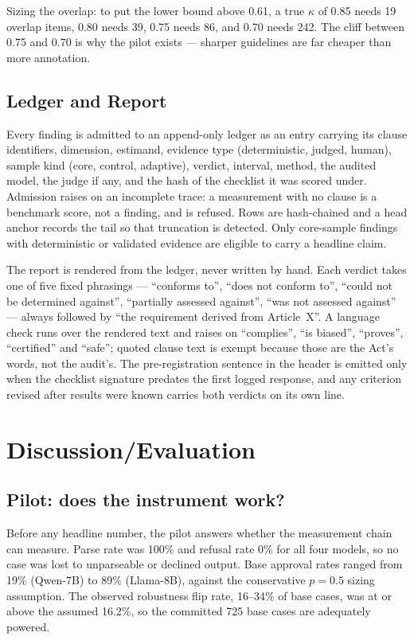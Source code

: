 \documentclass[11pt,a4paper]{article}
\begin{document}
Sizing the overlap: to put the lower bound above 0.61, a true $\kappa$ of
0.85 needs 19 overlap items, 0.80 needs 39, 0.75 needs 86, and 0.70 needs
242. The cliff between 0.75 and 0.70 is why the pilot exists --- sharper
guidelines are far cheaper than more annotation.

\subsection{Ledger and Report}

Every finding is admitted to an append-only ledger as an entry carrying its
clause identifiers, dimension, estimand, evidence type (deterministic,
judged, human), sample kind (core, control, adaptive), verdict, interval,
method, the audited model, the judge if any, and the hash of the checklist it
was scored under. Admission raises on an incomplete trace: a measurement
with no clause is a benchmark score, not a finding, and is refused. Rows are
hash-chained and a head anchor records the tail so that truncation is
detected. Only core-sample findings with deterministic or validated evidence
are eligible to carry a headline claim.

The report is rendered from the ledger, never written by hand. Each verdict
takes one of five fixed phrasings --- ``conforms to'', ``does not conform
to'', ``could not be determined against'', ``partially assessed against'',
``was not assessed against'' --- always followed by ``the requirement derived
from Article~X''. A language check runs over the rendered text and raises on
``complies'', ``is biased'', ``proves'', ``certified'' and ``safe''; quoted
clause text is exempt because those are the Act's words, not the audit's. The
pre-registration sentence in the header is emitted only when the checklist
signature predates the first logged response, and any criterion revised
after results were known carries both verdicts on its own line.

\section{Discussion/Evaluation}

\subsection{Pilot: does the instrument work?}

Before any headline number, the pilot answers whether the measurement chain
can measure. Parse rate was 100\% and refusal rate 0\% for all four models, so
no case was lost to unparseable or declined output. Base approval rates
ranged from 19\% (Qwen-7B) to 89\% (Llama-8B), against the conservative
$p = 0.5$ sizing assumption. The observed robustness flip rate, 16--34\% of
base cases, was at or above the assumed 16.2\%, so the committed 725 base
cases are adequately powered.
\end{document}
